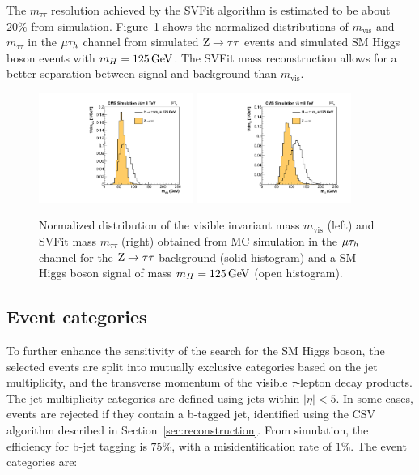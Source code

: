 \documentclass[12pt,twoside,a4paper,cmspaper,final,collab]{cms-tdr}
\begin{document}
The $m_{\tau\tau}$  resolution achieved by the SVFit algorithm is estimated to be about
$20\%$ from simulation.
Figure~\ref{fig:htt_svfitperf} shows the normalized distributions of $m_\text{vis}$ and $m_{\tau\tau}$ in the ${\mu}\tau_h$ channel
from simulated  $\mathrm{Z} \to \tau \tau$ events and simulated SM Higgs boson events with $m_H=125\,\text{Ge\hspace{-.08em}V}$.
The SVFit mass reconstruction allows for a better separation between signal and background than $m_\text{vis}$.

\begin{figure}[htbp]
\begin{center}
\includegraphics[width=0.45\textwidth]{figures/htt/svFitPerformance_forColin_visMass.pdf}
\includegraphics[width=0.45\textwidth]{figures/htt/svFitPerformance_forColin_svFitMass.pdf} \\
\end{center}
\caption{Normalized distribution of the visible invariant mass $m_\text{vis}$ (left) and SVFit mass $m_{\tau\tau}$ (right) obtained from MC simulation in the
${\mu}\tau_h$ channel for the $\mathrm{Z}\to \tau \tau$ background (solid histogram) and a SM Higgs boson signal of mass  $m_H=125\,\text{Ge\hspace{-.08em}V}$ (open histogram).}
\label{fig:htt_svfitperf}
\end{figure}


\subsection{Event categories}

To further enhance the sensitivity of the search for the SM Higgs boson, the selected events are split into mutually exclusive categories based on the
jet multiplicity, and the transverse momentum of the visible $\tau$-lepton decay products.
The jet multiplicity categories are defined using jets within $|\eta|<5$.
In some cases, events are rejected if they contain a b-tagged jet, identified using the CSV algorithm described in Section~\ref{sec:reconstruction}.
From simulation, the efficiency for  b-jet tagging is $75$\%, with a misidentification rate of $1$\%. The event categories are:
\end{document}
